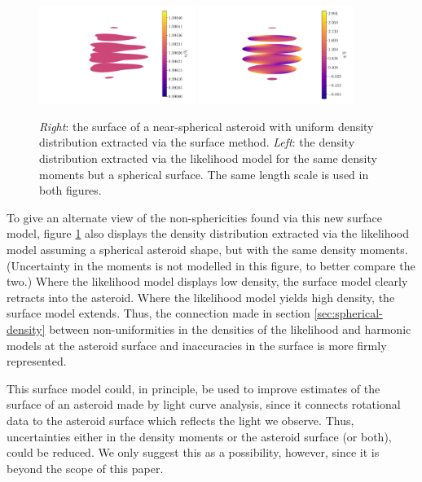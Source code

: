 \documentclass[fleqn,usenatbib]{mnras}
\begin{document}
\begin{figure}
  \centering
  \includegraphics[width=0.45\textwidth]{figs/high-surface.pdf}\hfill
  \includegraphics[width=0.45\textwidth]{figs/high-likelihood.pdf}
  \caption{\textit{Right}: the surface of a near-spherical asteroid with uniform density distribution extracted via the surface method. \textit{Left}: the density distribution extracted via the likelihood model for the same density moments but a spherical surface. The same length scale is used in both figures.}
  \label{fig:surface-density}
\end{figure}

To give an alternate view of the non-sphericities found via this new surface model, figure \ref{fig:surface-density} also displays the density distribution extracted via the likelihood model assuming a spherical asteroid shape, but with the same density moments. (Uncertainty in the moments is not modelled in this figure, to better compare the two.) Where the likelihood model displays low density, the surface model clearly retracts into the asteroid. Where the likelihood model yields high density, the surface model extends. Thus, the connection made in section \ref{sec:spherical-density} between non-uniformities in the densities of the likelihood and harmonic models at the asteroid surface and inaccuracies in the surface is more firmly represented.

This surface model could, in principle, be used to improve estimates of the surface of an asteroid made by light curve analysis, since it connects rotational data to the asteroid surface which reflects the light we observe. Thus, uncertainties either in the density moments or the asteroid surface (or both), could be reduced. We only suggest this as a possibility, however, since it is beyond the scope of this paper.
\end{document}
